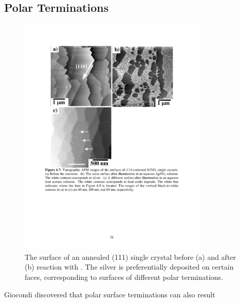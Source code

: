\subsection{Polar Terminations}
\label{subsec:background.polarterms}


\begin{figure}
\begin{center}
\includegraphics[width=0.8\textwidth]{giocondi.pdf}
\caption[Surface of an annealed  (111) single crystal]{%
	The surface of an annealed  (111) single crystal before 
	(a) and after (b) reaction with . The silver is preferentially 
	deposited on certain faces, corresponding to surfaces of different 
	polar terminations.\cite{Giocondi:2003wc}}
\label{fig:giocondi}
\end{center}
\end{figure}
Giocondi\cite{Giocondi:2003wc} discovered that polar surface terminations can also result
